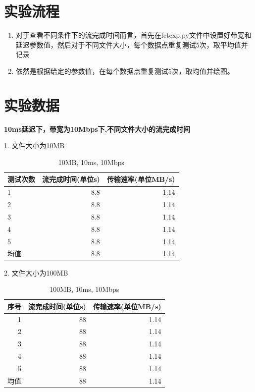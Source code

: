 \documentclass[11pt]{article}
\begin{document}
\section{实验流程}

\begin{enumerate}
  \item 对于查看不同条件下的流完成时间而言，首先在fctexp.py文件中设置好带宽和延迟参数值，然后对于不同文件大小，每个数据点重复测试5次，取平均值并记录
  
  \item 依然是根据给定的参数值，在每个数据点重复测试5次，取均值并绘图。
\end{enumerate}


\section{实验数据}

\newpage 

\textbf{10ms延迟下，带宽为10Mbps下,不同文件大小的流完成时间}

1. 文件大小为10MB

\begin{table}[htbp]
  \centering
  \caption{10MB, 10ms, 10Mbps}
    \begin{tabular}{|l|r|r|}
    \hline
    测试次数 & 流完成时间(单位s) & 传输速率(单位MB/s) \\
    \hline
    1     & 8.8   & 1.14 \\
    \hline
    2     & 8.8   & 1.14 \\
    \hline
    3     & 8.8   & 1.14 \\
    \hline
    4     & 8.8   & 1.14 \\
    \hline
    5     & 8.8   & 1.14 \\
    \hline
    均值   & 8.8   & 1.14 \\
    \hline
    \end{tabular}%
\end{table}%

2. 文件大小为100MB


\begin{table}[htbp]
  \centering
  \caption{100MB, 10ms, 10Mbps}
    \begin{tabular}{|l|r|r|}
    \hline
    序号    & \multicolumn{1}{l|}{流完成时间(单位s)} & \multicolumn{1}{l|}{传输速率(单位MB/s)} \bigstrut\\
    \hline
    \multicolumn{1}{|r|}{1} & 88    & 1.14 \bigstrut\\
    \hline
    \multicolumn{1}{|r|}{2} & 88    & 1.14 \bigstrut\\
    \hline
    \multicolumn{1}{|r|}{3} & 88    & 1.14 \bigstrut\\
    \hline
    \multicolumn{1}{|r|}{4} & 88    & 1.14 \bigstrut\\
    \hline
    \multicolumn{1}{|r|}{5} & 88    & 1.14 \bigstrut\\
    \hline
    均值    & 88    & 1.14 \bigstrut\\
    \hline
  \end{tabular}%

\end{table}%
\end{document}
